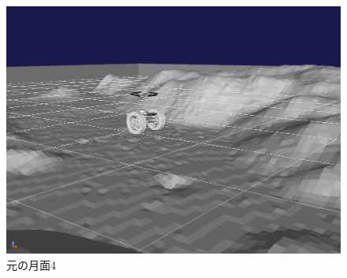  \begin{figure}[htbp]
  \begin{center}
   \includegraphics[width=0.6\linewidth]{images/original_moon_field4.png}
   \caption{元の月面4}
   \label{fig:original_moon_field4}
  \end{center}
 \end{figure}



